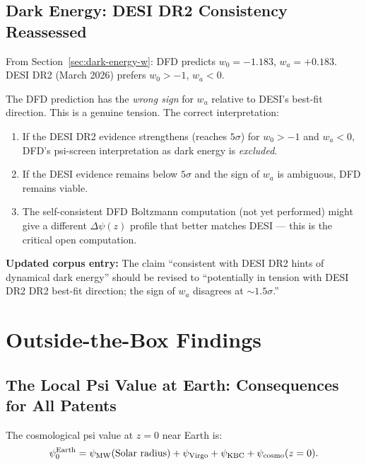 \documentclass[11pt]{article}
\theoremstyle{definition}
\theoremstyle{remark}
\begin{document}
\subsection{Dark Energy: DESI DR2 Consistency Reassessed}

From Section~\ref{sec:dark-energy-w}: DFD predicts $w_0 = -1.183$,
$w_a = +0.183$. DESI DR2 (March 2026) prefers $w_0 > -1$, $w_a < 0$.

The DFD prediction has the \emph{wrong sign} for $w_a$ relative to DESI's
best-fit direction. This is a genuine tension. The correct interpretation:

\begin{enumerate}
\item If the DESI DR2 evidence strengthens (reaches $5\sigma$) for
  $w_0 > -1$ and $w_a < 0$, DFD's psi-screen interpretation as dark
  energy is \emph{excluded}.
\item If the DESI evidence remains below $5\sigma$ and the sign of
  $w_a$ is ambiguous, DFD remains viable.
\item The self-consistent DFD Boltzmann computation (not yet performed)
  might give a different $\Delta\psi(z)$ profile that better matches
  DESI --- this is the critical open computation.
\end{enumerate}

\textbf{Updated corpus entry:} The claim ``consistent with DESI DR2 hints
of dynamical dark energy'' should be revised to ``potentially in tension
with DESI DR2 DR2 best-fit direction; the sign of $w_a$ disagrees at
$\sim 1.5\sigma$.''

\section{Outside-the-Box Findings}
\label{sec:outside-box}

\subsection{The Local Psi Value at Earth: Consequences for All Patents}
\label{sec:local-psi}

The cosmological psi value at $z=0$ near Earth is:
\begin{equation}
\psi_0^{\rm Earth} = \psi_{\rm MW}(\text{Solar radius}) +
\psi_{\rm Virgo} + \psi_{\rm KBC} + \psi_{\rm cosmo}(z=0).
\end{equation}
\end{document}
